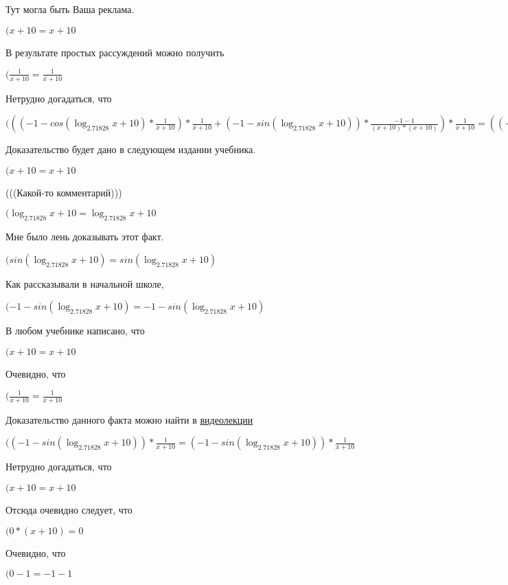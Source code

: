 \documentclass[12pt,a4paper,fleqn]{article}
\theoremstyle{definition}
\begin{document}
Тут могла быть Ваша реклама.

$( x  +  10  =  x  +  10 $

В результате простых рассуждений можно получить

$(\frac{ 1 }{ x  +  10 }
 = \frac{ 1 }{ x  +  10 }
$

Нетрудно догадаться, что

$((( -1  - cos(\log_{ 2.71828 }{ x  +  10 }) * \frac{ 1 }{ x  +  10 }
) * \frac{ 1 }{ x  +  10 }
 + ( -1  - sin(\log_{ 2.71828 }{ x  +  10 })) * \frac{ -1  -  1 }{( x  +  10 ) * ( x  +  10 )}
) * \frac{ 1 }{ x  +  10 }
 = (( -1  - cos(\log_{ 2.71828 }{ x  +  10 }) * \frac{ 1 }{ x  +  10 }
) * \frac{ 1 }{ x  +  10 }
 + ( -1  - sin(\log_{ 2.71828 }{ x  +  10 })) * \frac{ -1  -  1 }{( x  +  10 ) * ( x  +  10 )}
) * \frac{ 1 }{ x  +  10 }
$

Доказательство будет дано в следующем издании учебника.

$( x  +  10  =  x  +  10 $

(((Какой-то комментарий)))

$(\log_{ 2.71828 }{ x  +  10 } = \log_{ 2.71828 }{ x  +  10 }$

Мне было лень доказывать этот факт.

$(sin(\log_{ 2.71828 }{ x  +  10 }) = sin(\log_{ 2.71828 }{ x  +  10 })$

Как рассказывали в начальной школе,

$( -1  - sin(\log_{ 2.71828 }{ x  +  10 }) =  -1  - sin(\log_{ 2.71828 }{ x  +  10 })$

В любом учебнике написано, что

$( x  +  10  =  x  +  10 $

Очевидно, что

$(\frac{ 1 }{ x  +  10 }
 = \frac{ 1 }{ x  +  10 }
$

Доказательство данного факта можно найти в \href{https://www.youtube.com/watch?v=dQw4w9WgXcQ}{видеолекции}

$(( -1  - sin(\log_{ 2.71828 }{ x  +  10 })) * \frac{ 1 }{ x  +  10 }
 = ( -1  - sin(\log_{ 2.71828 }{ x  +  10 })) * \frac{ 1 }{ x  +  10 }
$

Нетрудно догадаться, что

$( x  +  10  =  x  +  10 $

Отсюда очевидно следует, что

$( 0  * ( x  +  10 ) =  0 $

Очевидно, что

$( 0  -  1  =  -1  -  1 $
\end{document}
